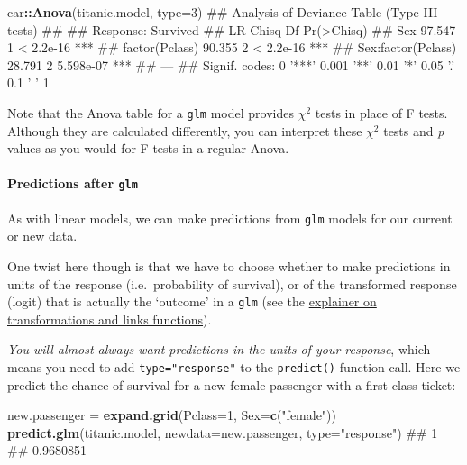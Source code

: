 \documentclass[]{article}
\newenvironment{Shaded}{\begin{snugshade}}{\end{snugshade}}
\newcommand{\KeywordTok}[1]{\textcolor[rgb]{0.13,0.29,0.53}{\textbf{#1}}}
\newcommand{\DataTypeTok}[1]{\textcolor[rgb]{0.13,0.29,0.53}{#1}}
\newcommand{\DecValTok}[1]{\textcolor[rgb]{0.00,0.00,0.81}{#1}}
\newcommand{\StringTok}[1]{\textcolor[rgb]{0.31,0.60,0.02}{#1}}
\newcommand{\OperatorTok}[1]{\textcolor[rgb]{0.81,0.36,0.00}{\textbf{#1}}}
\newcommand{\NormalTok}[1]{#1}
\let\oldparagraph\paragraph
\renewcommand{\paragraph}[1]{\oldparagraph{#1}\mbox{}}
\theoremstyle{definition}
\theoremstyle{definition}
\theoremstyle{definition}
\theoremstyle{remark}
\begin{document}
\begin{Shaded}
\begin{Highlighting}[]
\NormalTok{car}\OperatorTok{::}\KeywordTok{Anova}\NormalTok{(titanic.model, }\DataTypeTok{type=}\DecValTok{3}\NormalTok{)}
\NormalTok{## Analysis of Deviance Table (Type III tests)}
\NormalTok{## }
\NormalTok{## Response: Survived}
\NormalTok{##                    LR Chisq Df Pr(>Chisq)    }
\NormalTok{## Sex                  97.547  1  < 2.2e-16 ***}
\NormalTok{## factor(Pclass)       90.355  2  < 2.2e-16 ***}
\NormalTok{## Sex:factor(Pclass)   28.791  2  5.598e-07 ***}
\NormalTok{## ---}
\NormalTok{## Signif. codes:  0 '***' 0.001 '**' 0.01 '*' 0.05 '.' 0.1 ' ' 1}
\end{Highlighting}
\end{Shaded}

{Note that the Anova table for a \texttt{glm} model provides \(\chi^2\)
tests in place of F tests. Although they are calculated differently, you
can interpret these \(\chi^2\) tests and \emph{p} values as you would
for F tests in a regular Anova.}

\paragraph{\texorpdfstring{Predictions after
\texttt{glm}}{Predictions after glm}}\label{glm-predictions}

As with linear models, we can make predictions from \texttt{glm} models
for our current or new data.

One twist here though is that we have to choose whether to make
predictions in units of the response (i.e.~probability of survival), or
of the transformed response (logit) that is actually the `outcome' in a
\texttt{glm} (see the \protect\hyperlink{link-functions}{explainer on
transformations and links functions}).

\emph{You will almost always want predictions in the units of your
response}, which means you need to add \texttt{type="response"} to the
\texttt{predict()} function call. Here we predict the chance of survival
for a new female passenger with a first class ticket:

\begin{Shaded}
\begin{Highlighting}[]
\NormalTok{new.passenger =}\StringTok{ }\KeywordTok{expand.grid}\NormalTok{(}\DataTypeTok{Pclass=}\DecValTok{1}\NormalTok{, }\DataTypeTok{Sex=}\KeywordTok{c}\NormalTok{(}\StringTok{"female"}\NormalTok{))}
\KeywordTok{predict.glm}\NormalTok{(titanic.model, }\DataTypeTok{newdata=}\NormalTok{new.passenger, }\DataTypeTok{type=}\StringTok{"response"}\NormalTok{)}
\NormalTok{##         1 }
\NormalTok{## 0.9680851}
\end{Highlighting}
\end{Shaded}
\end{document}
